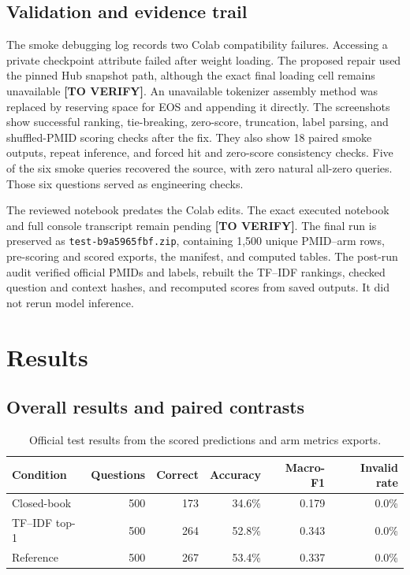 \documentclass[manuscript,nonacm]{acmart}
\begin{document}
\subsection{Validation and evidence trail}
The smoke debugging log records two Colab compatibility failures. Accessing a private checkpoint attribute failed after weight loading. The proposed repair used the pinned Hub snapshot path, although the exact final loading cell remains unavailable \textbf{[TO VERIFY]}. An unavailable tokenizer assembly method was replaced by reserving space for EOS and appending it directly. The screenshots show successful ranking, tie-breaking, zero-score, truncation, label parsing, and shuffled-PMID scoring checks after the fix. They also show 18 paired smoke outputs, repeat inference, and forced hit and zero-score consistency checks. Five of the six smoke queries recovered the source, with zero natural all-zero queries. Those six questions served as engineering checks.

The reviewed notebook predates the Colab edits. The exact executed notebook and full console transcript remain pending \textbf{[TO VERIFY]}. The final run is preserved as \texttt{test-b9a5965fbf.zip}, containing 1,500 unique PMID--arm rows, pre-scoring and scored exports, the manifest, and computed tables. The post-run audit verified official PMIDs and labels, rebuilt the TF--IDF rankings, checked question and context hashes, and recomputed scores from saved outputs. It did not rerun model inference.

\section{Results}
\subsection{Overall results and paired contrasts}
\begin{table}[htbp]
\caption{Official test results from the scored predictions and arm metrics exports.}
\label{tab:overall}
\centering
\begin{tabular}{@{}lrrrrr@{}}
\toprule Condition & Questions & Correct & Accuracy & Macro-F1 & Invalid rate\\\midrule
Closed-book & 500 & 173 & 34.6\% & 0.179 & 0.0\%\\
TF--IDF top-1 & 500 & 264 & 52.8\% & 0.343 & 0.0\%\\
Reference & 500 & 267 & 53.4\% & 0.337 & 0.0\%\\\bottomrule
\end{tabular}
\end{table}
\end{document}
